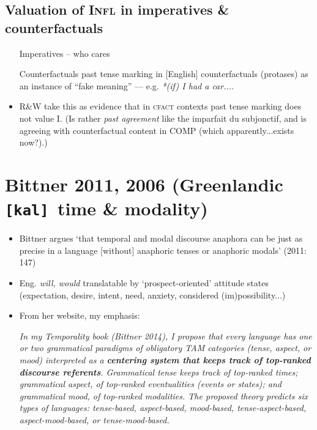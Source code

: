 \documentclass[10pt]{article}
\begin{document}
	\subsection*{Valuation of \textsc{Infl} in imperatives \& counterfactuals}
	\begin{itemize}
		\item[Imperatives] -- who cares
		\item[Counterfactuals] past tense marking in [English] counterfactuals (protases) as an instance of ``fake meaning'' --- e.g. \textit{*(if) I had a car...}.
		\item R\&W take this as evidence that in \textsc{cfact} contexts past tense marking does not value I. (Is rather \textit{past agreement} like the imparfait du subjonctif, and is agreeing with counterfactual content in COMP (which apparently...exists now?).) 
	\end{itemize}
	


\section{Bittner 2011, 2006 (Greenlandic \texttt{[kal] }time \& modality)}
\begin{itemize}
	\item Bittner argues `that temporal and modal discourse anaphora can be just as precise in a language [without] anaphoric tenses or anaphoric modals' (2011: 147)
	\item Eng. \textit{will, would} translatable by `prospect-oriented' attitude states (expectation, desire, intent, need, anxiety, considered (im)possibility...)
	
	\item From her website, my emphasis:
	
	
	 \textit{In my Temporality book (Bittner 2014), I propose that every language has one or two grammatical paradigms of obligatory TAM categories (tense, aspect, or mood) interpreted as a \textbf{centering system that keeps track of top-ranked discourse referents}. Grammatical tense keeps track of top-ranked times; grammatical aspect, of top-ranked eventualities (events or states); and grammatical mood, of top-ranked modalities. The proposed theory predicts six types of languages: tense-based, aspect-based, mood-based, tense-aspect-based, aspect-mood-based, or tense-mood-based.}

\end{itemize}
\end{document}
